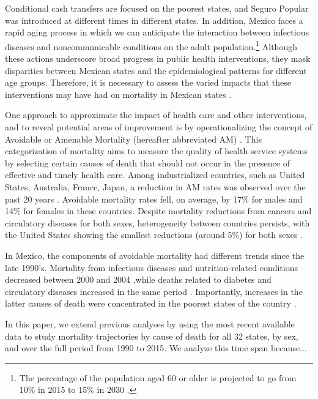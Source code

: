 \documentclass{bmcart}
\begin{document}
Conditional cash transfers are focused on the poorest states, and Seguro Popular was introduced at different times in different states. In addition, Mexico faces a rapid aging process in which we can anticipate the interaction between infectious diseases and noncommunicable conditions \cite{Bygbjerg1499} on the adult population.\footnote{The percentage of the population aged 60 or older is projected to go from 10\% in 2015 to 15\% in 2030 \cite{CONAPO}.} Although these actions underscore broad progress in public health interventions, they mask disparities between Mexican states and the epidemiological patterns for different age groups. Therefore, it is necessary to assess the varied impacts that these interventions may have had on mortality in Mexican states \cite{urquieta2015evolution}. 

 
 One approach to approximate the impact of health care and other interventions, and to reveal potential areas of improvement is by operationalizing the
 concept of Avoidable or Amenable Mortality (hereafter abbreviated AM)
 \cite{nolte&mckee2004, nolte&mckee2008,elo2014}. This categorization of mortality aims to measure the quality of health service systems by selecting certain
 causes of death that should not occur in the presence of effective and
 timely health care. Among industrialized countries, such as United States,
 Australia, France, Japan, a reduction in AM rates was
 observed over the past 20 years
 \cite{nolte&mckee2008}. Avoidable mortality rates fell, on average, by 17\%
 for males and 14\% for females in these countries. Despite mortality reductions from cancers and circulatory diseases for
 both sexes, heterogeneity between countries persists, with the United
 States showing the smallest reductions (around 5\%) for both sexes  \cite{nolte&mckee2008}. 
 
 In Mexico, the components of avoidable mortality had different trends since the
late 1990's. Mortality from infectious diseases and nutrition-related conditions decreased between 2000 and 2004 \cite{francomarina2006},while deaths related to diabetes and circulatory diseases increased in the same period \cite{agudelo2014efecto}. Importantly, increases in the latter causes
of death were concentrated in the poorest states of the country
\cite{davila2014mortalidad}. 

In this paper, we extend previous analyses by using the most recent available data to study mortality trajectories by cause of death for all 32 states, by sex, and over the full period from 1990 to 2015. We analyze this time span because...
\end{document}
